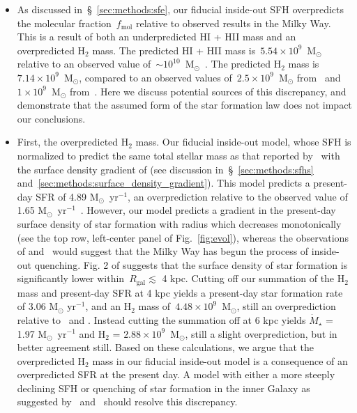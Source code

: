 \documentclass[fleqn, usenatbib]{mnras}
\begin{document}
\begin{appendices}
\begin{itemize}
	\item As discussed in~\S~\ref{sec:methods:sfe}, our fiducial inside-out 
	SFH overpredicts the molecular fraction~$f_\text{mol}$ relative to 
	observed results in the Milky Way. This is a result of both an 
	underpredicted HI + HII mass and an overpredicted H$_2$ mass. The 
	predicted HI + HII mass is~$5.54\times10^9$~M$_\odot$ relative to an 
	observed value of~$\sim10^{10}$~M$_\odot$~\citep{Kalberla2009}. The 
	predicted H$_2$ mass is~$7.14\times10^9$~M$_\odot$, compared to an 
	observed values of~$2.5\times10^9$~M$_\odot$ from~\citet{Kalberla2009} and 
	$1\times10^9$~M$_\odot$ from~\citet{Heyer2015}. Here we discuss potential 
	sources of this discrepancy, and demonstrate that the assumed form of the 
	star formation law does not impact our conclusions. 

	\item First, the overpredicted H$_2$ mass. Our fiducial inside-out model, 
	whose SFH is normalized to predict the same total stellar mass as that 
	reported by~\citet{Licquia2015} with the surface density gradient of 
	\citet{Bland-Hawthorn2016} (see discussion in~\S~\ref{sec:methods:sfhs} 
	and~\ref{sec:methods:surface_density_gradient}). This model predicts a 
	present-day SFR of 4.89 M$_\odot$~yr$^{-1}$, an overprediction relative to 
	the observed value of 1.65 M$_\odot$~yr$^{-1}$~\citep{Licquia2015}. 
	However, our model predicts a gradient in the present-day surface density 
	of star formation with radius which decreases monotonically (see the top 
	row, left-center panel of Fig.~\ref{fig:evol}), whereas the observations 
	of \citet{Peek2009} and~\citet{Fraternali2012} would suggest that the 
	Milky Way has begun the process of inside-out quenching. Fig. 2 of 
	\citet{Fraternali2012} suggests that the surface density of star 
	formation is significantly lower within~$R_\text{gal} \lesssim$ 4 kpc. 
	Cutting off our summation of the H$_2$ mass and present-day SFR at 
	4 kpc yields a present-day star formation rate of 3.06 M$_\odot$ 
	yr$^{-1}$, and an H$_2$ mass of~$4.48\times10^9$~M$_\odot$, still an 
	overprediction relative to~\citet{Licquia2015} and 
	\citet{Kalberla2009}. Instead cutting the summation off at 6 kpc 
	yields $\dot{M}_\star$ = 1.97 M$_\odot$~yr$^{-1}$ and H$_2$ = 
	$2.88\times10^9$~M$_\odot$, still a slight overprediction, but in 
	better agreement still. Based on these calculations, we argue that the 
	overpredicted H$_2$ mass in our fiducial inside-out model is a consequence 
	of an overpredicted SFR at the present day. A model with either a more 
	steeply declining SFH or quenching of star formation in the inner Galaxy 
	as suggested by~\citet{Peek2009} and~\citet{Fraternali2012} should resolve 
	this discrepancy. 


\end{itemize}
\end{appendices}
\end{document}
